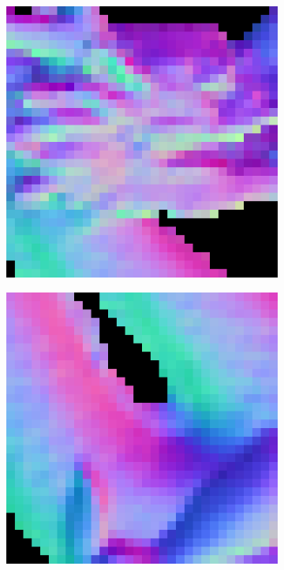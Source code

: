\begin{figure}[th]
\begin{subfigure}[b]{0.18\linewidth}
		\includegraphics[width=\linewidth]{./Figures/gcnn_synthetic/eval_7_2_22_normal.png}
	\end{subfigure}
	\begin{subfigure}[b]{0.18\linewidth}
		\includegraphics[width=\linewidth]{./Figures/gcnn_synthetic/eval_7_32_12_normal.png}

\end{subfigure}
\end{figure}
